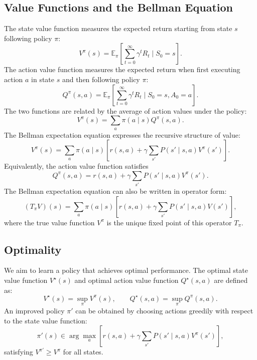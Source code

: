 \documentclass{article}
\begin{document}
\subsection{Value Functions and the Bellman Equation}
The state value function measures the expected return starting from state $s$ following policy $\pi$:
\begin{equation}
    V^\pi(s) =
    \mathbb{E}_{\pi}
    \left[
        \sum_{t=0}^{\infty}\gamma^t R_t
        \mid S_0=s
    \right].
\end{equation}
The action value function measures the expected return when first executing action $a$ in state $s$ and then following policy $\pi$:
\begin{equation}
    Q^\pi(s,a) =
    \mathbb{E}_{\pi}
    \left[
        \sum_{t=0}^{\infty}\gamma^t R_t
        \mid S_0=s, A_0=a
    \right].
\end{equation}
The two functions are related by the average of action values under the policy:
\begin{equation}
    V^\pi(s) = \sum_{a}\pi(a\mid s)Q^\pi(s,a).
\end{equation}
The Bellman expectation equation expresses the recursive structure of value:
\begin{equation}
    V^\pi(s) =
    \sum_a \pi(a\mid s)
    \left[
        r(s,a) + \gamma \sum_{s'}P(s'\mid s,a)V^\pi(s')
    \right].
\end{equation}
Equivalently, the action value function satisfies
\begin{equation}
    Q^\pi(s,a) =
    r(s,a) + \gamma \sum_{s'}P(s'\mid s,a)V^\pi(s').
\end{equation}
The Bellman expectation equation can also be written in operator form:
\begin{equation}
    (T_\pi V)(s) = \sum_a \pi(a \mid s) \left[ r(s,a) + \gamma \sum_{s'} P(s' \mid s,a) V(s') \right],
\end{equation}
where the true value function $V^\pi$ is the unique fixed point of this operator $T_\pi$.

\subsection{Optimality}
We aim to learn a policy that achieves optimal performance. The optimal state value function $V^\star(s)$ and optimal action value function $Q^\star(s,a)$ are defined as:
\begin{equation}
    V^\star(s) = \sup_\pi V^\pi(s), \qquad Q^\star(s,a) = \sup_\pi Q^\pi(s,a).
\end{equation}
An improved policy $\pi'$ can be obtained by choosing actions greedily with respect to the state value function:
\begin{equation}
    \pi'(s) \in \arg\max_a \left[ r(s,a) + \gamma \sum_{s'} P(s'\mid s,a) V^\pi(s') \right],
\end{equation}
satisfying $V^{\pi'} \ge V^\pi$ for all states.
\end{document}
